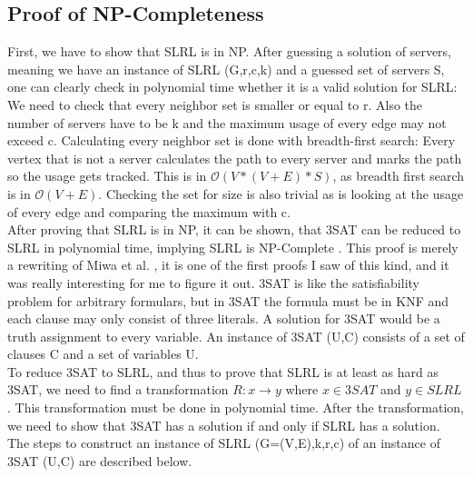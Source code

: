 \documentclass [12pt]{article}
\begin{document}
\subsection{Proof of NP-Completeness}
First, we have to show that SLRL is in NP. After guessing a solution of servers, meaning we 
have an instance of SLRL (G,r,c,k) and a guessed set of servers S, one can clearly check 
in polynomial time whether it is a valid solution for SLRL: We need to check that every neighbor set is smaller
or equal to r. Also the number of servers have to be k and the maximum usage of every edge may not exceed c.
Calculating every neighbor set is done with breadth-first search: Every vertex that is not a server calculates
the path to every server and marks the path so the usage gets tracked. This is in $\mathcal{O}(V*(V+E)*S)$, as breadth first
search is in $\mathcal{O}(V+E)$. Checking the set for size is also trivial as is looking at the usage of
every edge and comparing the maximum with c.\\
After proving that SLRL is in NP, it can be shown, that 3SAT can be reduced to SLRL in polynomial time,
implying SLRL is NP-Complete \cite{Garey:1979:CIG:578533}.
This proof is merely a rewriting of Miwa et al. \cite{mirrorserver}, it is one of the first proofs I saw of 
this kind, and it was really interesting for me to figure it out.
3SAT is like the satisfiability problem for arbitrary formulars, but in 3SAT the formula must be in KNF and 
each clause may only consist of three literals. A solution for 3SAT would be a truth assignment to every
variable. An instance of 3SAT (U,C) consists of a set of clauses C and a set of variables U.\\
To reduce 3SAT to SLRL, and thus to prove that SLRL is at least as hard as 3SAT, we need to find a 
transformation $R: x \rightarrow y$ where $x \in 3SAT$ and $y \in SLRL$. This transformation must be 
done in polynomial time. After the transformation, we need to show that 3SAT has a solution if and only if 
SLRL has a solution.\\
The steps to construct an instance of SLRL (G=(V,E),k,r,c) of an instance of 3SAT (U,C) are described below.
\end{document}
